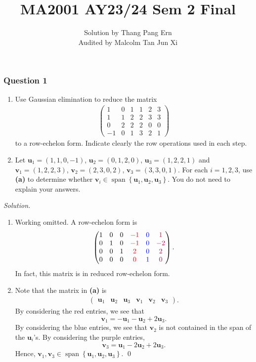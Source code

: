 \documentclass[12pt]{article}
\title{MA2001 AY23/24 Sem 2 Final}
\author{
  Solution by Thang Pang Ern\\
  Audited by Malcolm Tan Jun Xi
}
\date{}
\begin{document}
\maketitle
\subsubsection*{Question 1}
\begin{enumerate}[label=\textbf{(\alph*)}]
    \itemsep 0em
    \item Use Gaussian elimination to reduce the matrix \begin{align*}
        \begin{pmatrix}
            1 &0&1&1&2&3\\1&1&2&2&3&3\\0&2&2&2&0&0\\-1&0&1&3&2&1
        \end{pmatrix}
    \end{align*}
    to a row-echelon form. Indicate clearly the row operations used in each step.
    \item Let $\mathbf{u}_1=\left(1,1,0,-1\right)$, $\mathbf{u}_2=\left(0,1,2,0\right)$, $\mathbf{u}_3=\left(1,2,2,1\right)$ and $\mathbf{v}_1=\left(1,2,2,3\right)$, $\mathbf{v}_2=\left(2,3,0,2\right)$, $\mathbf{v}_3=\left(3,3,0,1\right)$. For each $i=1,2,3$, use \textbf{(a)} to determine whether $\mathbf{v}_i\in \operatorname{span}\left\{\mathbf{u}_1,\mathbf{u}_2,\mathbf{u}_3\right\}$. You do not need to explain your answers.
\end{enumerate}
\noindent\emph{Solution.}
\begin{enumerate}[label=\textbf{(\alph*)}]
    \itemsep 0em
    \item Working omitted. A row-echelon form is \[\begin{pmatrix}1&0&0&\textcolor{red}{-1}&\textcolor{blue}{0}&\textcolor{purple}{1}\\ 0&1&0&\textcolor{red}{-1}&\textcolor{blue}{0}&\textcolor{purple}{-2}\\ 0&0&1&\textcolor{red}{2}&\textcolor{blue}{0}&\textcolor{purple}{2}\\ 0&0&0&\textcolor{red}{0}&\textcolor{blue}{1}&\textcolor{purple}{0}\end{pmatrix}.\]
    In fact, this matrix is in reduced row-echelon form.
    \item Note that the matrix in \textbf{(a)} is \begin{align*}
        \begin{pmatrix}
            \mathbf{u}_1 & \mathbf{u}_2 & \mathbf{u}_3 & \mathbf{v}_1 & \mathbf{v}_2 & \mathbf{v}_3
        \end{pmatrix}.
    \end{align*}
    By considering the red entries, we see that \[\mathbf{v}_1=-\mathbf{u}_1-\mathbf{u}_2+2\mathbf{u}_3.\]
    By considering the blue entries, we see that $\mathbf{v}_2$ is not contained in the span of the $\mathbf{u}_i$'s. By considering the purple entries, \[\mathbf{v}_3=\mathbf{u}_1-2\mathbf{u}_2+2\mathbf{u}_3.\]
    Hence, $\mathbf{v}_1,\mathbf{v}_3\in\operatorname{span}\left\{\mathbf{u}_1,\mathbf{u}_2,\mathbf{u}_3\right\}$. \qed 
\end{enumerate}
\end{document}
